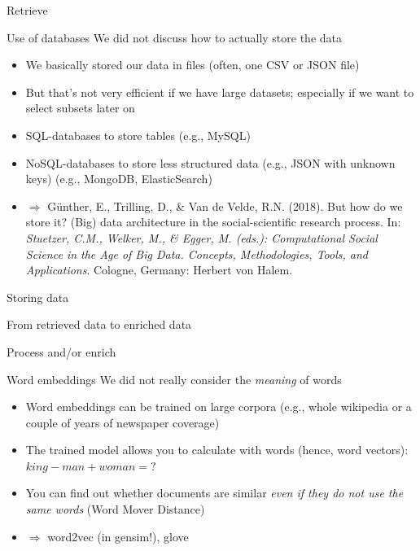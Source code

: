 \documentclass{beamer}
\begin{document}
\begin{frame}{Retrieve}
	\begin{block}{Use of databases}
	We did not discuss how to actually store the data
	\begin{itemize}
		\item We basically stored our data in files (often, one CSV or JSON file)
		\item But that's not very efficient if we have large datasets; especially if we want to select subsets later on
		\item SQL-databases to store tables (e.g., MySQL)
		\item NoSQL-databases to store less structured data (e.g., JSON with unknown keys) (e.g., MongoDB, ElasticSearch)
		\item $\Rightarrow$ \tiny{Günther, E., Trilling, D., \& Van de Velde, R.N. (2018). But how do we store it? (Big) data architecture in the social-scientific research process. In:\textit{ Stuetzer, C.M., Welker, M., \& Egger, M. (eds.): Computational Social Science in the Age of Big Data. Concepts, Methodologies, Tools, and Applications}. Cologne, Germany: Herbert von Halem.}
	\end{itemize}
	\end{block}
\end{frame}


\begin{frame}{Storing data}
\end{frame}


\begin{frame}{From retrieved data to enriched data}
\end{frame}




\begin{frame}{Process and/or enrich}
	\begin{block}{Word embeddings}
	We did not really consider the \emph{meaning} of words
		\begin{itemize}
		\item Word embeddings can be trained on large corpora (e.g., whole wikipedia or a couple of years of newspaper coverage) 
		\item The trained model allows you to calculate with words (hence, word vectors): $king-man+woman = ?$ 
		\item You can find out whether documents are similar \emph{even if they do not use the same words} (Word Mover Distance)
		\item $\Rightarrow$ word2vec (in gensim!), glove
		\end{itemize}
	\end{block}
\end{frame}
\end{document}
